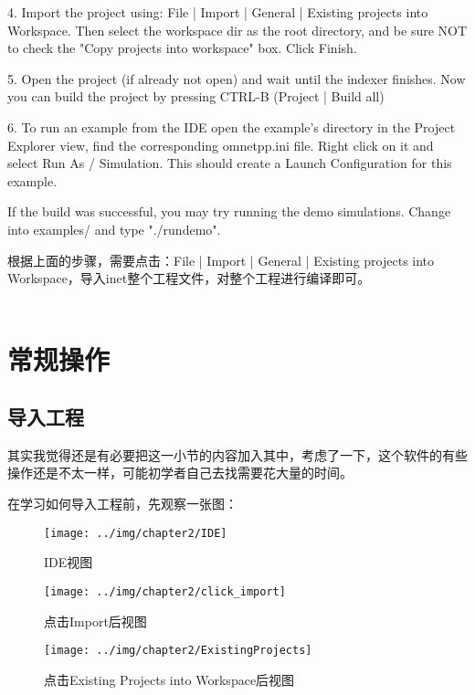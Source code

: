 \begin{itemize}
\begin{definition}
	4. Import the project using: File | Import | General | Existing projects into Workspace.
	Then select the workspace dir as the root directory, and be sure NOT to check the
	"Copy projects into workspace" box. Click Finish.
	
	5. Open the project (if already not open) and wait until the indexer finishes.
	Now you can build the project by pressing CTRL-B (Project | Build all)
	
	6. To run an example from the IDE open the example's directory in the Project Explorer view,
	find the corresponding omnetpp.ini file. Right click on it and select Run As / Simulation.
	This should create a Launch Configuration for this example.
	
	If the build was successful, you may try running the demo simulations.
	Change into examples/ and type "./rundemo".
\end{definition}
根据上面的步骤，需要点击：File | Import | General | Existing projects into Workspace，导入inet整个工程文件，对整个工程进行编译即可。\\ \\
	
\end{itemize}


\section{常规操作}
\subsection{导入工程}
其实我觉得还是有必要把这一小节的内容加入其中，考虑了一下，这个软件的有些操作还是不太一样，可能初学者自己去找需要花大量的时间。

在学习如何导入工程前，先观察一张图：

\begin{figure}	
	\centering
	\texttt{[image: ../img/chapter2/IDE]}
	\caption{IDE视图}\label{fig:1a}
\end{figure}

\begin{figure}
	\centering
	\texttt{[image: ../img/chapter2/click\_import]}
	\caption{点击Import后视图}\label{fig:1a}	
\end{figure}

\begin{figure}
	\centering
	\texttt{[image: ../img/chapter2/ExistingProjects]}
	\caption{点击Existing Projects into Workspace后视图}\label{fig:1a}
\end{figure}

